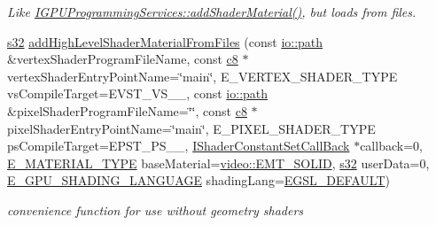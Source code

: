\begin{DoxyCompactItemize}
\begin{DoxyCompactList}\small\item\em Like \hyperlink{classirr_1_1video_1_1IGPUProgrammingServices_af7c7515773d4be33e1c66b8e3b65c293}{I\+G\+P\+U\+Programming\+Services\+::add\+Shader\+Material()}, but loads from files. \end{DoxyCompactList}\item 
\mbox{\label{classirr_1_1video_1_1IGPUProgrammingServices_a2e6abff7d3e976d65955aae13df5e500}} 
\hyperlink{namespaceirr_ac66849b7a6ed16e30ebede579f9b47c6}{s32} \hyperlink{classirr_1_1video_1_1IGPUProgrammingServices_a2e6abff7d3e976d65955aae13df5e500}{add\+High\+Level\+Shader\+Material\+From\+Files} (const \hyperlink{namespaceirr_1_1io_a6468281622ce3a1c46b72e19f32dded5}{io\+::path} \&vertex\+Shader\+Program\+File\+Name, const \hyperlink{namespaceirr_a9395eaea339bcb546b319e9c96bf7410}{c8} $\ast$vertex\+Shader\+Entry\+Point\+Name=\char`\"{}main\char`\"{}, E\+\_\+\+V\+E\+R\+T\+E\+X\+\_\+\+S\+H\+A\+D\+E\+R\+\_\+\+T\+Y\+PE vs\+Compile\+Target=E\+V\+S\+T\+\_\+\+V\+S\+\_\+\_, const \hyperlink{namespaceirr_1_1io_a6468281622ce3a1c46b72e19f32dded5}{io\+::path} \&pixel\+Shader\+Program\+File\+Name=\char`\"{}\char`\"{}, const \hyperlink{namespaceirr_a9395eaea339bcb546b319e9c96bf7410}{c8} $\ast$pixel\+Shader\+Entry\+Point\+Name=\char`\"{}main\char`\"{}, E\+\_\+\+P\+I\+X\+E\+L\+\_\+\+S\+H\+A\+D\+E\+R\+\_\+\+T\+Y\+PE ps\+Compile\+Target=E\+P\+S\+T\+\_\+\+P\+S\+\_\+\_, \hyperlink{classirr_1_1video_1_1IShaderConstantSetCallBack}{I\+Shader\+Constant\+Set\+Call\+Back} $\ast$callback=0, \hyperlink{namespaceirr_1_1video_ac8e9b6c66f7cebabd1a6d30cbc5430f1}{E\+\_\+\+M\+A\+T\+E\+R\+I\+A\+L\+\_\+\+T\+Y\+PE} base\+Material=\hyperlink{namespaceirr_1_1video_ac8e9b6c66f7cebabd1a6d30cbc5430f1aa0b13db05ac3b5f40e692769de202660}{video\+::\+E\+M\+T\+\_\+\+S\+O\+L\+ID}, \hyperlink{namespaceirr_ac66849b7a6ed16e30ebede579f9b47c6}{s32} user\+Data=0, \hyperlink{namespaceirr_1_1video_a913671e32f20f13e51336bfbe20a82a3}{E\+\_\+\+G\+P\+U\+\_\+\+S\+H\+A\+D\+I\+N\+G\+\_\+\+L\+A\+N\+G\+U\+A\+GE} shading\+Lang=\hyperlink{namespaceirr_1_1video_a913671e32f20f13e51336bfbe20a82a3a3eebb0c52e3bcfee28013cfb518b4ea9}{E\+G\+S\+L\+\_\+\+D\+E\+F\+A\+U\+LT})
\begin{DoxyCompactList}\small\item\em convenience function for use without geometry shaders \end{DoxyCompactList}\item 

\end{DoxyCompactItemize}
